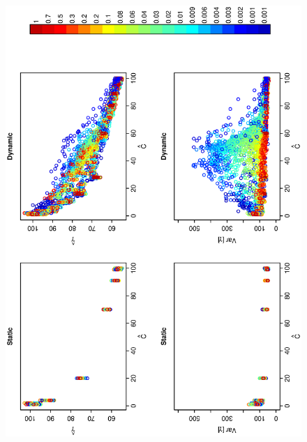\documentclass[12pt]{article}
\begin{document}
\begin{figure}[hb!]
\hspace{-0.5 in}\includegraphics[width=5in,angle=-90]{./figures/components_vs_gamma.eps}
\caption{}
\label{fig:Figure5}
\end{figure}
\end{document}
